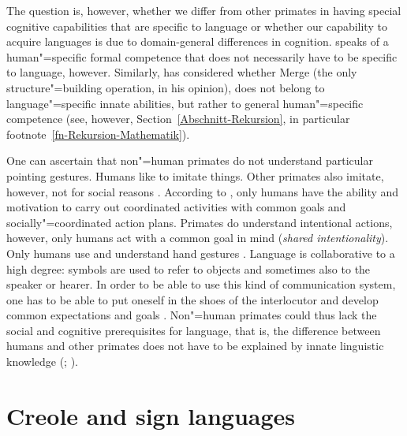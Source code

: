 The question is, however, whether we differ from other primates in having special cognitive
capabilities that are specific to language or whether our capability to acquire languages is due to
domain-general differences in cognition. \citet[Section~2]{Fanselow92b} speaks of a human"=specific formal competence that does not necessarily
have to be specific to language, however. Similarly, \citet[--8]{Chomsky2007a} has considered whether Merge (the only structure"=building
operation, in his opinion), does not belong to language"=specific innate abilities, but rather to general human"=specific competence (see, however,
Section~\ref{Abschnitt-Rekursion}, in particular footnote~\ref{fn-Rekursion-Mathematik}).  

One can ascertain that non"=human primates do not understand particular pointing gestures. Humans like to imitate things. Other primates also imitate, however, not
for social reasons \citep[--10]{Tomasello2006c}. According to \citet[]{TCCBM2005a}, only humans have the ability and motivation to
carry out coordinated activities with common goals and socially"=coordinated action plans. Primates do understand intentional actions, however, only humans
act with a common goal in mind (\emph{shared intentionality}).
Only humans use and understand hand gestures \citep[, 724, 726]{TCCBM2005a}. Language is collaborative to a high degree: symbols
are used to refer to objects and sometimes also to the speaker or hearer. In order to be able to use this kind of communication system, one has to be able to
put oneself in the shoes of the interlocutor and develop common expectations and goals \citep[]{TCCBM2005a}.
Non"=human primates could thus lack the social and cognitive prerequisites for language, that is, the difference between humans and other primates does not have
to be explained by innate linguistic knowledge (\citealp[Section 8.1.2]{Tomasello2003a};
\citealp{TCCBM2005a}).

\section{Creole and sign languages}

